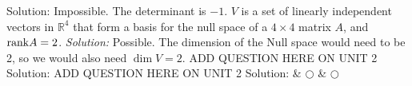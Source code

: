     \ifnum {} {\color{DarkBlue} Solution:  Impossible. The determinant is $-1$. 
    } \fi
\fi    
\ifnum {} %
    \setlength{\extrarowheight}{0.00cm} $V$ is a set of linearly independent vectors in $\mathbb R^4$ that form a basis for the null space of a $4\times 4$ matrix $A$, and $\text{rank} A = 2$.  
    \ifnum {} {\color{DarkBlue} \textit{Solution:  } Possible. The dimension of the Null space would need to be 2, so we would also need $\dim V = 2$. } \fi
\fi    
\ifnum {} %
    \setlength{\extrarowheight}{0.00cm} ADD QUESTION HERE ON UNIT 2
    \ifnum {} {\color{DarkBlue} Solution:  
    } \fi
\fi    
\ifnum {} %
    \setlength{\extrarowheight}{0.00cm} ADD QUESTION HERE ON UNIT 2
    \ifnum {} {\color{DarkBlue} Solution:  
    } \fi
\fi    
& $\bigcirc$  & $\bigcirc$ \\     